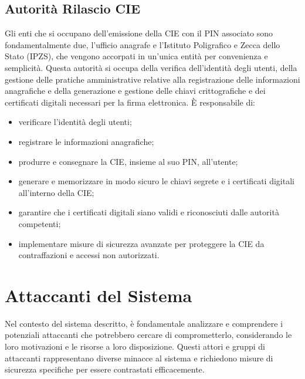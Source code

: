     \subsection{Autorità Rilascio CIE}
        Gli enti che si occupano dell'emissione della CIE con il PIN associato sono fondamentalmente due, l'ufficio anagrafe e l'Istituto Poligrafico e Zecca dello Stato (IPZS), che vengono accorpati in un'unica entità per convenienza e semplicità. Questa autorità si occupa della verifica dell'identità degli utenti, della gestione delle pratiche amministrative relative alla registrazione delle informazioni anagrafiche e della generazione e gestione delle chiavi crittografiche e dei certificati digitali necessari per la firma elettronica.
        È responsabile di:
            \begin{itemize}
                \item verificare l'identità degli utenti;

                \item registrare le informazioni anagrafiche;

                \item produrre e consegnare la CIE, insieme al suo PIN, all'utente;
            
                \item generare e memorizzare in modo sicuro le chiavi segrete e i certificati digitali all'interno della CIE;

                \item garantire che i certificati digitali siano validi e riconosciuti dalle autorità competenti;

                \item implementare misure di sicurezza avanzate per proteggere la CIE da contraffazioni e accessi non autorizzati.
            \end{itemize}


\section{Attaccanti del Sistema}
    Nel contesto del sistema descritto, è fondamentale analizzare e comprendere i potenziali attaccanti che potrebbero cercare di comprometterlo, considerando le loro motivazioni e le risorse a loro disposizione.
    Questi attori e gruppi di attaccanti rappresentano diverse minacce al sistema e richiedono misure di sicurezza specifiche per essere contrastati efficacemente.

